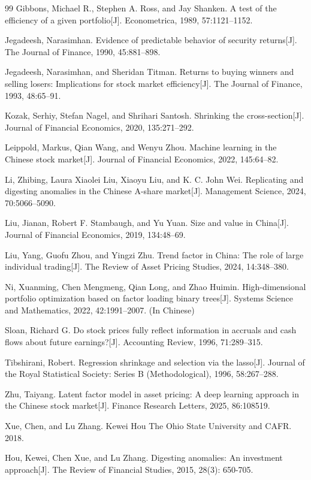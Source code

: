 \documentclass[12pt]{article}
\begin{document}
\begin{thebibliography}{99}
Gibbons, Michael R., Stephen A. Ross, and Jay Shanken.
A test of the efficiency of a given portfolio[J].
Econometrica, 1989, 57:1121--1152.

Jegadeesh, Narasimhan.
Evidence of predictable behavior of security returns[J].
The Journal of Finance, 1990, 45:881--898.

Jegadeesh, Narasimhan, and Sheridan Titman.
Returns to buying winners and selling losers: Implications for stock market efficiency[J].
The Journal of Finance, 1993, 48:65--91.

Kozak, Serhiy, Stefan Nagel, and Shrihari Santosh.
Shrinking the cross-section[J].
Journal of Financial Economics, 2020, 135:271--292.

Leippold, Markus, Qian Wang, and Wenyu Zhou.
Machine learning in the Chinese stock market[J].
Journal of Financial Economics, 2022, 145:64--82.

Li, Zhibing, Laura Xiaolei Liu, Xiaoyu Liu, and K. C. John Wei.
Replicating and digesting anomalies in the Chinese A-share market[J].
Management Science, 2024, 70:5066--5090.

Liu, Jianan, Robert F. Stambaugh, and Yu Yuan.
Size and value in China[J].
Journal of Financial Economics, 2019, 134:48--69.

Liu, Yang, Guofu Zhou, and Yingzi Zhu.
Trend factor in China: The role of large individual trading[J].
The Review of Asset Pricing Studies, 2024, 14:348--380.

Ni, Xuanming, Chen Mengmeng, Qian Long, and Zhao Huimin.
High-dimensional portfolio optimization based on factor loading binary trees[J].
Systems Science and Mathematics, 2022, 42:1991--2007. (In Chinese)

Sloan, Richard G.
Do stock prices fully reflect information in accruals and cash flows about future earnings?[J].
Accounting Review, 1996, 71:289--315.

Tibshirani, Robert.
Regression shrinkage and selection via the lasso[J].
Journal of the Royal Statistical Society: Series B (Methodological), 1996, 58:267--288.

Zhu, Taiyang.
Latent factor model in asset pricing: A deep learning approach in the Chinese stock market[J].
Finance Research Letters, 2025, 86:108519.

Xue, Chen, and Lu Zhang.
Kewei Hou The Ohio State University and CAFR.
2018.

Hou, Kewei, Chen Xue, and Lu Zhang.
Digesting anomalies: An investment approach[J].
The Review of Financial Studies, 2015, 28(3): 650-705.

\end{thebibliography}
\end{document}
